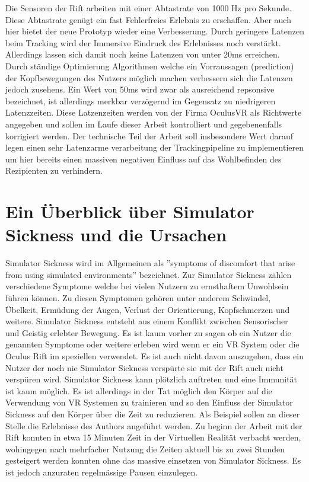 \documentclass[pagesize, paper=a4, fontsize=12pt,titlepage=true, headings=small, headnosepline, abstractoff, liststotoc, nochapterprefix, plainheadsepline]{scrreprt}
\begin{document}
Die Sensoren der Rift arbeiten mit einer Abtastrate von 1000 Hz pro Sekunde. Diese Abtastrate genügt ein fast Fehlerfreies Erlebnis zu erschaffen. Aber auch hier bietet der neue Prototyp wieder eine Verbesserung. Durch geringere Latenzen beim Tracking wird der Immersive Eindruck des Erlebnisses noch verstärkt. Allerdings lassen sich damit noch keine Latenzen von unter 20ms erreichen. Durch ständige Optimierung Algorithmen welche ein Vorraussagen (prediction) der Kopfbewegungen des Nutzers möglich machen verbessern sich die Latenzen jedoch zusehens. Ein Wert von 50ms wird zwar als ausreichend repsonsive bezeichnet, ist allerdings merkbar verzögernd im Gegensatz zu niedrigeren Latenzzeiten. Diese Latzenzeiten werden von der Firma OculusVR als Richtwerte angegeben und sollen im Laufe dieser Arbeit kontrolliert und gegebenenfalls korrigiert werden. Der technische Teil der Arbeit soll insbesondere Wert darauf legen einen sehr Latenzarme verarbeitung der Trackingpipeline zu implementieren um hier bereits einen massiven negativen Einfluss auf das Wohlbefinden des Rezipienten zu verhindern.


\section{Ein Überblick über Simulator Sickness und die Ursachen}
Simulator Sickness wird im Allgemeinen als ''symptoms of discomfort that arise from using simulated environments'' bezeichnet.
Zur Simulator Sickness zählen verschiedene Symptome welche bei vielen Nutzern zu ernsthaftem Unwohlsein führen können. Zu diesen Symptomen gehören unter anderem Schwindel, Übelkeit, Ermüdung der Augen, Verlust der Orientierung, Kopfschmerzen und weitere. Simulator Sickness entsteht aus einem Konflikt zwischen Sensorischer und Geistig erlebter Bewegung. Es ist kaum vorher zu sagen ob ein Nutzer die genannten Symptome oder weitere erleben wird wenn er ein VR System oder die Oculus Rift im speziellen verwendet. Es ist auch nicht davon auszugehen, dass ein Nutzer der noch nie Simulator Sickness verspürte sie mit der Rift auch nicht verspüren wird. Simulator Sickness kann plötzlich auftreten und eine Immunität ist kaum möglich. Es ist allerdings in der Tat möglich den Körper auf die Verwendung von VR Systemen zu trainieren und so den Einfluss der Simulator Sickness auf den Körper über die Zeit zu reduzieren. Als Beispiel sollen an dieser Stelle die Erlebnisse des Authors angeführt werden. Zu beginn der Arbeit mit der Rift konnten in etwa 15 Minuten Zeit in der Virtuellen Realität verbacht werden, wohingegen nach mehrfacher Nutzung die Zeiten aktuell bis zu zwei Stunden gesteigert werden konnten ohne das massive  einsetzen von Simulator Sickness. Es ist jedoch anzuraten regelmässige Pausen einzulegen.
\end{document}
